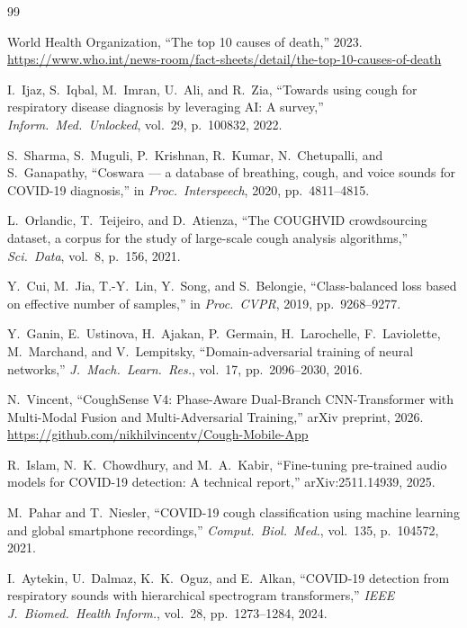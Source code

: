 \documentclass[journal]{IEEEtran}
\begin{document}
\begin{thebibliography}{99}

World Health Organization, ``The top 10 causes of death,'' 2023.
\url{https://www.who.int/news-room/fact-sheets/detail/the-top-10-causes-of-death}

I.~Ijaz, S.~Iqbal, M.~Imran, U.~Ali, and R.~Zia,
``Towards using cough for respiratory disease diagnosis by leveraging AI:
A survey,''
\emph{Inform.\ Med.\ Unlocked}, vol.~29, p.~100832, 2022.

S.~Sharma, S.~Muguli, P.~Krishnan, R.~Kumar, N.~Chetupalli, and
S.~Ganapathy,
``Coswara --- a database of breathing, cough, and voice sounds for
COVID-19 diagnosis,'' in \emph{Proc.\ Interspeech}, 2020, pp.~4811--4815.

L.~Orlandic, T.~Teijeiro, and D.~Atienza,
``The COUGHVID crowdsourcing dataset, a corpus for the study of large-scale
cough analysis algorithms,'' \emph{Sci.\ Data}, vol.~8, p.~156, 2021.

Y.~Cui, M.~Jia, T.-Y.~Lin, Y.~Song, and S.~Belongie,
``Class-balanced loss based on effective number of samples,''
in \emph{Proc.\ CVPR}, 2019, pp.~9268--9277.

Y.~Ganin, E.~Ustinova, H.~Ajakan, P.~Germain, H.~Larochelle,
F.~Laviolette, M.~Marchand, and V.~Lempitsky,
``Domain-adversarial training of neural networks,''
\emph{J.\ Mach.\ Learn.\ Res.}, vol.~17, pp.~2096--2030, 2016.

N.~Vincent,
``CoughSense V4: Phase-Aware Dual-Branch CNN-Transformer with
Multi-Modal Fusion and Multi-Adversarial Training,''
arXiv preprint, 2026.
\url{https://github.com/nikhilvincentv/Cough-Mobile-App}

R.~Islam, N.~K.~Chowdhury, and M.~A.~Kabir,
``Fine-tuning pre-trained audio models for COVID-19 detection:
A technical report,''
arXiv:2511.14939, 2025.

M.~Pahar and T.~Niesler,
``COVID-19 cough classification using machine learning and global
smartphone recordings,''
\emph{Comput.\ Biol.\ Med.}, vol.~135, p.~104572, 2021.

I.~Aytekin, U.~Dalmaz, K.~K.~Oguz, and E.~Alkan,
``COVID-19 detection from respiratory sounds with hierarchical spectrogram
transformers,''
\emph{IEEE J.\ Biomed.\ Health Inform.}, vol.~28, pp.~1273--1284, 2024.


\end{thebibliography}
\end{document}
